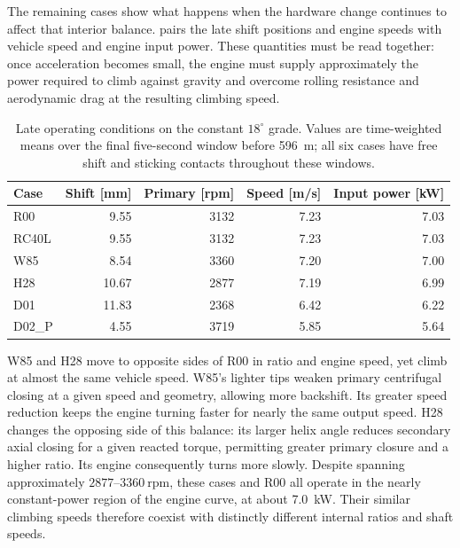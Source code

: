\documentclass[11pt]{report}
\numberwithin{equation}{section}
\begin{document}
The remaining cases show what happens when the hardware change continues to
affect that interior balance. 
pairs the late shift positions and engine speeds with vehicle speed and
engine input power. These quantities must be read together: once
acceleration becomes small, the engine must supply approximately the power required to climb against gravity and overcome rolling resistance and aerodynamic drag at the resulting climbing speed.

\begin{table}[H]
  \centering\small
  \setlength{\tabcolsep}{8pt}
  \renewcommand{\arraystretch}{1.14}
  \caption{Late operating conditions on the constant \(18^\circ\) grade.
  Values are time-weighted means over the final five-second window
  before \SI{596}{m}; all six cases have free shift and sticking contacts
  throughout these windows.}
  \label{tab:results_moderate_operating_conditions}
  \begin{tabular}{@{}lrrrr@{}}
    \toprule
    Case & Shift [mm] & Primary [rpm] & Speed [m/s] & Input power [kW] \\
    \midrule
    R00 & 9.55 & 3132 & 7.23 & 7.03 \\
    RC40L & 9.55 & 3132 & 7.23 & 7.03 \\
    W85 & 8.54 & 3360 & 7.20 & 7.00 \\
    H28 & 10.67 & 2877 & 7.19 & 6.99 \\
    D01 & 11.83 & 2368 & 6.42 & 6.22 \\
    D02\_P & 4.55 & 3719 & 5.85 & 5.64 \\
    \bottomrule
  \end{tabular}

\end{table}

W85 and H28 move to opposite sides of R00 in ratio and engine speed, yet
climb at almost the same vehicle speed. W85's lighter tips weaken primary
centrifugal closing at a given speed and geometry, allowing more backshift.
Its greater speed reduction keeps the engine turning faster for nearly the same output speed. H28 changes the opposing side of this balance: its larger helix angle
reduces secondary axial closing for a given reacted torque, permitting
greater primary closure and a higher ratio. Its engine consequently turns
more slowly. Despite spanning approximately \(2877\)--\(3360~\mathrm{rpm}\),
these cases and R00 all operate in the nearly constant-power region of the
engine curve, at about \SI{7.0}{kW}. Their similar climbing speeds therefore coexist
with distinctly different internal ratios and shaft speeds.
\end{document}
